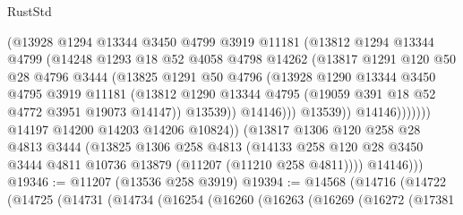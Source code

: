 \begin{lexlean}{RustStd}
\begin{coremodule}
                            (@13928
                              @1294
                              @13344
                              @3450
                              @4799
                              @3919
                              @11181
                              (@13812
                                @1294
                                @13344
                                @4799
                                (@14248
                                  @1293
                                  @18
                                  @52
                                  @4058
                                  @4798
                                  @14262
                                  (@13817
                                    @1291
                                    @120
                                    @50
                                    @28
                                    @4796
                                    @3444
                                    (@13825
                                      @1291
                                      @50
                                      @4796
                                      (@13928
                                        @1290
                                        @13344
                                        @3450
                                        @4795
                                        @3919
                                        @11181
                                        (@13812
                                          @1290
                                          @13344
                                          @4795
                                          (@19059 @391 @18 @52 @4772 @3951 @19073 @14147))
                                        @13539))
                                    @14146)))
                              @13539))
                          @14146)))))))
            @14197
            @14200
            @14203
            @14206
            @10824))
        (@13817
          @1306
          @120
          @258
          @28
          @4813
          @3444
          (@13825
            @1306
            @258
            @4813
            (@14133 @258 @120 @28 @3450 @3444 @4811 @10736 @13879 (@11207 (@11210 @258 @4811))))
          @14146)))
@19346 := @11207 (@13536 @258 @3919)
@19394 := @14568
    (@14716
      (@14722
        (@14725
          (@14731
            (@14734
              (@16254
                (@16260
                  (@16263
                    (@16269
                      (@16272
                        (@17381

\end{coremodule}
\end{lexlean}
